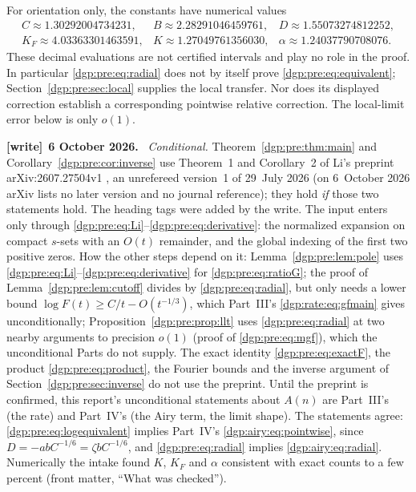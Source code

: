 \documentclass[11pt,letterpaper]{article}
\numberwithin{equation}{section}
\theoremstyle{remark}\newtheorem{remark}[theorem]{Remark}
\newenvironment{writenote}[1][]{\par\smallskip\begingroup\small
 \noindent\textbf{[write]}\if\relax\detokenize{#1}\relax\else~\textbf{#1.}\fi\ }%
 {\par\endgroup\smallskip}
\begin{document}
For orientation only, the constants have numerical values
\[
\begin{array}{lll}
 C\approx1.30292004734231,& B\approx2.28291046459761,&D\approx1.55073274812252,\\
 K_F\approx4.03363301463591,&K\approx1.27049761356030,&\alpha\approx1.24037790708076.
\end{array}
\]
These decimal evaluations are not certified intervals and play no role
in the proof. In particular \eqref{dgp:pre:eq:radial} does not by itself prove
\eqref{dgp:pre:eq:equivalent}; Section~\ref{dgp:pre:sec:local} supplies the local transfer.
Nor does its displayed correction establish a corresponding pointwise
relative correction. The local-limit error below is only $o(1)$.
\begin{writenote}[6 October 2026]
\emph{Conditional.} Theorem~\ref{dgp:pre:thm:main} and Corollary~\ref{dgp:pre:cor:inverse} use Theorem~1 and Corollary~2 of Li's preprint arXiv:2607.27504v1 \cite{li}, an unrefereed version~1 of 29~July 2026 (on 6~October 2026 arXiv lists no later version and no journal reference); they hold \emph{if} those two statements hold. The heading tags were added by the write. The input enters only through \eqref{dgp:pre:eq:Li}--\eqref{dgp:pre:eq:derivative}: the normalized expansion on compact $s$-sets with an $O(t)$ remainder, and the global indexing of the first two positive zeros. How the other steps depend on it: Lemma~\ref{dgp:pre:lem:pole} uses \eqref{dgp:pre:eq:Li}--\eqref{dgp:pre:eq:derivative} for \eqref{dgp:pre:eq:ratioG}; the proof of Lemma~\ref{dgp:pre:lem:cutoff} divides by \eqref{dgp:pre:eq:radial}, but only needs a lower bound $\log F(t)\ge C/t-O(t^{-1/3})$, which Part~III's \eqref{dgp:rate:eq:gfmain} gives unconditionally; Proposition~\ref{dgp:pre:prop:llt} uses \eqref{dgp:pre:eq:radial} at two nearby arguments to precision $o(1)$ (proof of \eqref{dgp:pre:eq:mgf}), which the unconditional Parts do not supply. The exact identity \eqref{dgp:pre:eq:exactF}, the product \eqref{dgp:pre:eq:product}, the Fourier bounds and the inverse argument of Section~\ref{dgp:pre:sec:inverse} do not use the preprint. Until the preprint is confirmed, this report's unconditional statements about $A(n)$ are Part~III's (the rate) and Part~IV's (the Airy term, the limit shape). The statements agree: \eqref{dgp:pre:eq:logequivalent} implies Part~IV's \eqref{dgp:airy:eq:pointwise}, since $D=-abC^{-1/6}=\zeta bC^{-1/6}$, and \eqref{dgp:pre:eq:radial} implies \eqref{dgp:airy:eq:radial}. Numerically the intake found $K$, $K_F$ and $\alpha$ consistent with exact counts to a few percent (front matter, ``What was checked'').
\end{writenote}
\end{document}

